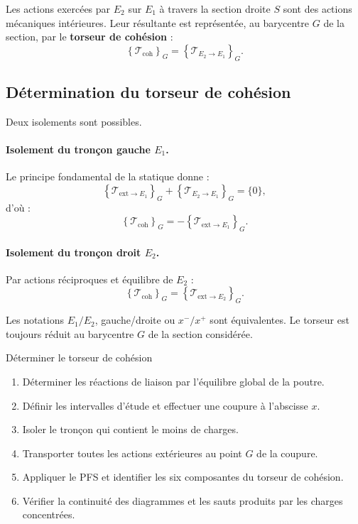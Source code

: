 Les actions exercées par $E_2$ sur $E_1$ à travers la section droite $S$ sont des actions mécaniques intérieures. Leur résultante est représentée, au barycentre $G$ de la section, par le \textbf{torseur de cohésion} :
\[
\left\{\mathcal T_{\mathrm{coh}}\right\}_G
=\left\{\mathcal T_{E_2\rightarrow E_1}\right\}_G.
\]

\TLCoupurePoutre

\subsection{Détermination du torseur de cohésion}

Deux isolements sont possibles.

\paragraph{Isolement du tronçon gauche $E_1$.}
Le principe fondamental de la statique donne :
\[
\left\{\mathcal T_{\mathrm{ext}\rightarrow E_1}\right\}_G
+\left\{\mathcal T_{E_2\rightarrow E_1}\right\}_G=\{0\},
\]
d'où :
\[
\boxed{\left\{\mathcal T_{\mathrm{coh}}\right\}_G
=-\left\{\mathcal T_{\mathrm{ext}\rightarrow E_1}\right\}_G.}
\]

\paragraph{Isolement du tronçon droit $E_2$.}
Par actions réciproques et équilibre de $E_2$ :
\[
\boxed{\left\{\mathcal T_{\mathrm{coh}}\right\}_G
=\left\{\mathcal T_{\mathrm{ext}\rightarrow E_2}\right\}_G.}
\]

Les notations $E_1/E_2$, gauche/droite ou $x^-/x^+$ sont équivalentes. Le torseur est toujours réduit au barycentre $G$ de la section considérée.

\begin{TLMethod}{Déterminer le torseur de cohésion}
\begin{enumerate}
  \item Déterminer les réactions de liaison par l'équilibre global de la poutre.
  \item Définir les intervalles d'étude et effectuer une coupure à l'abscisse $x$.
  \item Isoler le tronçon qui contient le moins de charges.
  \item Transporter toutes les actions extérieures au point $G$ de la coupure.
  \item Appliquer le PFS et identifier les six composantes du torseur de cohésion.
  \item Vérifier la continuité des diagrammes et les sauts produits par les charges concentrées.
\end{enumerate}
\end{TLMethod}

